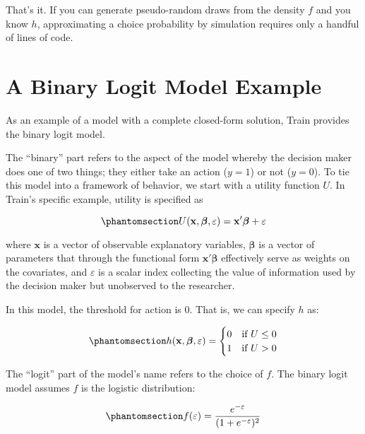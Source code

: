 \documentclass[
  letterpaper,
  DIV=11,
  numbers=noendperiod]{scrreprt}
\begin{document}
That's it. If you can generate pseudo-random draws from the density
\(f\) and you know \(h\), approximating a choice probability by
simulation requires only a handful of lines of code.

\section{A Binary Logit Model Example}\label{sec-binary_logit}

As an example of a model with a complete closed-form solution, Train
provides the binary logit model.

The ``binary'' part refers to the aspect of the model whereby the
decision maker does one of two things; they either take an action
(\(y=1\)) or not (\(y=0\)). To tie this model into a framework of
behavior, we start with a utility function \(U\). In Train's specific
example, utility is specified as

\begin{equation}\phantomsection\label{eq-u_binlogit}{
U(\mathbf{x}, \boldsymbol{\beta}, \varepsilon) = \mathbf{x}'\boldsymbol{\beta}+ \varepsilon
}\end{equation}

where \(\mathbf{x}\) is a vector of observable explanatory variables,
\(\boldsymbol{\beta}\) is a vector of parameters that through the
functional form \(\mathbf{x}'\boldsymbol{\beta}\) effectively serve as
weights on the covariates, and \(\varepsilon\) is a scalar index
collecting the value of information used by the decision maker but
unobserved to the researcher.

In this model, the threshold for action is 0. That is, we can specify
\(h\) as:

\begin{equation}\phantomsection\label{eq-h_binlogit}{
h(\mathbf{x}, \boldsymbol{\beta}, \varepsilon) = 
    \begin{cases}
        0  & \text{if } U \le 0 \\
        1  & \text{if } U > 0 
    \end{cases}
}\end{equation}

The ``logit'' part of the model's name refers to the choice of \(f\).
The binary logit model assumes \(f\) is the logistic distribution:

\begin{equation}\phantomsection\label{eq-bin_logistic_dist}{
f(\varepsilon) = \frac{e^{-\varepsilon}}{(1+e^{-\varepsilon})^2}
}\end{equation}
\end{document}
